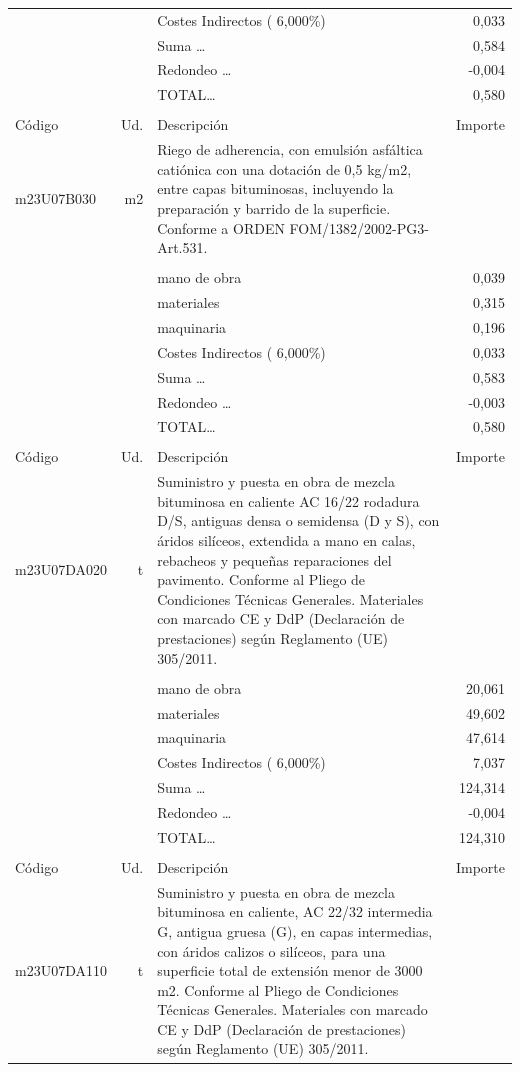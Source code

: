 \documentclass{book}%
\begin{document}
\begin{supertabular}{l r p{60mm} r}
&&Costes Indirectos (     6,000\%)&     0,033\\%
&&Suma \ldots&     0,584\\%
&&Redondeo \ldots&    {-}0,004\\%
%
&&TOTAL\ldots&     0,580\\%
&&&\\%
Código&Ud.&Descripción&Importe\\%
\hline%
m23U07B030&m2&Riego de adherencia, con emulsión asfáltica catiónica con una dotación de 0,5 kg/m2, entre capas bituminosas, incluyendo la preparación y barrido de la superficie. Conforme a ORDEN FOM/1382/2002{-}PG3{-}Art.531.&\\%
&&&\\%
&&mano de obra&     0,039\\%
&&materiales&     0,315\\%
&&maquinaria&     0,196\\%
&&Costes Indirectos (     6,000\%)&     0,033\\%
&&Suma \ldots&     0,583\\%
&&Redondeo \ldots&    {-}0,003\\%
%
&&TOTAL\ldots&     0,580\\%
&&&\\%
Código&Ud.&Descripción&Importe\\%
\hline%
m23U07DA020&t&Suministro y puesta en obra de mezcla bituminosa en caliente AC 16/22 rodadura D/S, antiguas densa o semidensa (D y S), con áridos silíceos, extendida a mano en calas, rebacheos y pequeñas reparaciones del pavimento. Conforme al Pliego de Condiciones Técnicas Generales. Materiales con marcado CE y DdP (Declaración de prestaciones) según Reglamento (UE) 305/2011.&\\%
&&&\\%
&&mano de obra&    20,061\\%
&&materiales&    49,602\\%
&&maquinaria&    47,614\\%
&&Costes Indirectos (     6,000\%)&     7,037\\%
&&Suma \ldots&   124,314\\%
&&Redondeo \ldots&    {-}0,004\\%
%
&&TOTAL\ldots&   124,310\\%
&&&\\%
Código&Ud.&Descripción&Importe\\%
\hline%
m23U07DA110&t&Suministro y puesta en obra de mezcla bituminosa en caliente, AC 22/32 intermedia G, antigua gruesa (G), en capas intermedias, con áridos calizos o silíceos, para una superficie total de extensión menor de 3000 m2. Conforme al Pliego de Condiciones Técnicas Generales. Materiales con marcado CE y DdP (Declaración de prestaciones) según Reglamento (UE) 305/2011.&\\%

\end{supertabular}
\end{document}

